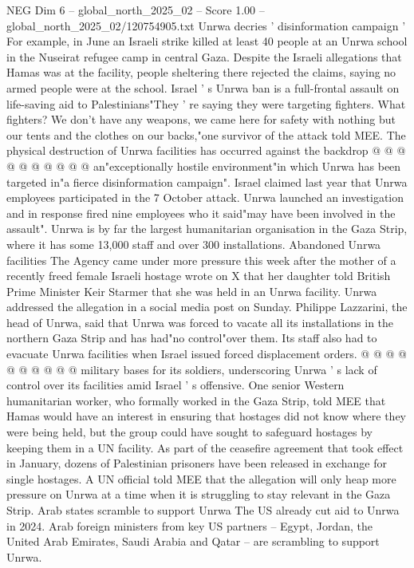\begin{textsample}{NEG Dim 6 – global\_north\_2025\_02 – Score 1.00 – global\_north\_2025\_02/120754905.txt}
Unrwa decries ' disinformation campaign ' For example, in June an Israeli strike killed at least 40 people at an Unrwa school in the Nuseirat refugee camp in central Gaza.
Despite the Israeli allegations that Hamas was at the facility, people sheltering there rejected the claims, saying no armed people were at the school.
Israel ' s Unrwa ban is a full-frontal assault on life-saving aid to Palestinians"They ' re saying they were targeting fighters.
What fighters?
We don't have any weapons, we came here for safety with nothing but our tents and the clothes on our backs,"one survivor of the attack told MEE.
The physical destruction of Unrwa facilities has occurred against the backdrop @ @ @ @ @ @ @ @ @ @ an"exceptionally hostile environment"in which Unrwa has been targeted in"a fierce disinformation campaign".
Israel claimed last year that Unrwa employees participated in the 7 October attack.
Unrwa launched an investigation and in response fired nine employees who it said"may have been involved in the assault".
Unrwa is by far the largest humanitarian organisation in the Gaza Strip, where it has some 13,000 staff and over 300 installations.
Abandoned Unrwa facilities The Agency came under more pressure this week after the mother of a recently freed female Israeli hostage wrote on X that her daughter told British Prime Minister Keir Starmer that she was held in an Unrwa facility.
Unrwa addressed the allegation in a social media post on Sunday.
Philippe Lazzarini, the head of Unrwa, said that Unrwa was forced to vacate all its installations in the northern Gaza Strip and has had"no control"over them.
Its staff also had to evacuate Unrwa facilities when Israel issued forced displacement orders. @ @ @ @ @ @ @ @ @ @ military bases for its soldiers, underscoring Unrwa ' s lack of control over its facilities amid Israel ' s offensive.
One senior Western humanitarian worker, who formally worked in the Gaza Strip, told MEE that Hamas would have an interest in ensuring that hostages did not know where they were being held, but the group could have sought to safeguard hostages by keeping them in a UN facility.
As part of the ceasefire agreement that took effect in January, dozens of Palestinian prisoners have been released in exchange for single hostages.
A UN official told MEE that the allegation will only heap more pressure on Unrwa at a time when it is struggling to stay relevant in the Gaza Strip.
Arab states scramble to support Unrwa The US already cut aid to Unrwa in 2024.
Arab foreign ministers from key US partners -- Egypt, Jordan, the United Arab Emirates, Saudi Arabia and Qatar -- are scrambling to support Unrwa.

\end{textsample}
